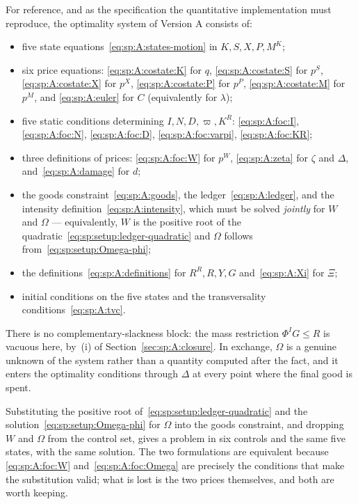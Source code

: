 For reference, and as the specification the quantitative implementation must reproduce, the
optimality system of Version A consists of:
\begin{itemize}[leftmargin=1.6em,itemsep=0.15em]
\item five state equations~\eqref{eq:sp:A:states-motion} in $K,S,X,P,M^K$;
\item six price equations: \eqref{eq:sp:A:costate:K} for $q$, \eqref{eq:sp:A:costate:S} for $p^S$,
\eqref{eq:sp:A:costate:X} for $p^X$, \eqref{eq:sp:A:costate:P} for $p^P$, \eqref{eq:sp:A:costate:M}
for $p^M$, and \eqref{eq:sp:A:euler} for $C$ (equivalently for $\lambda$);
\item five static conditions determining $I,N,D,\varpi,K^R$: \eqref{eq:sp:A:foc:I},
\eqref{eq:sp:A:foc:N}, \eqref{eq:sp:A:foc:D}, \eqref{eq:sp:A:foc:varpi}, \eqref{eq:sp:A:foc:KR};
\item three definitions of prices: \eqref{eq:sp:A:foc:W} for $p^W$, \eqref{eq:sp:A:zeta} for $\zeta$
and $\Delta$, and~\eqref{eq:sp:A:damage} for $d$;
\item the goods constraint~\eqref{eq:sp:A:goods}, the ledger~\eqref{eq:sp:A:ledger}, and the intensity
definition~\eqref{eq:sp:A:intensity}, which must be solved \emph{jointly} for $W$ and $\Omega$ ---
equivalently, $W$ is the positive root of the quadratic~\eqref{eq:sp:setup:ledger-quadratic} and
$\Omega$ follows from~\eqref{eq:sp:setup:Omega-phi};
\item the definitions~\eqref{eq:sp:A:definitions} for $R^R,R,Y,G$ and~\eqref{eq:sp:A:Xi} for $\Xi$;
\item initial conditions on the five states and the transversality conditions~\eqref{eq:sp:A:tvc}.
\end{itemize}
There is no complementary-slackness block: the mass restriction $\Phi^IG\le R$ is vacuous here, by~(i)
of Section~\ref{sec:sp:A:closure}. In exchange, $\Omega$ is a genuine unknown of the system rather than
a quantity computed after the fact, and it enters the optimality conditions through $\Delta$ at every
point where the final good is spent.

\begin{remark}\label{rem:sp:A:reduced}
Substituting the positive root of~\eqref{eq:sp:setup:ledger-quadratic} and the
solution~\eqref{eq:sp:setup:Omega-phi} for $\Omega$ into the goods constraint, and dropping $W$ and
$\Omega$ from the control set, gives a problem in six controls and the same five states, with the same
solution. The two formulations are equivalent because \eqref{eq:sp:A:foc:W} and~\eqref{eq:sp:A:foc:Omega}
are precisely the conditions that make the substitution valid; what is lost is the two prices
themselves, and both are worth keeping.
\end{remark}

